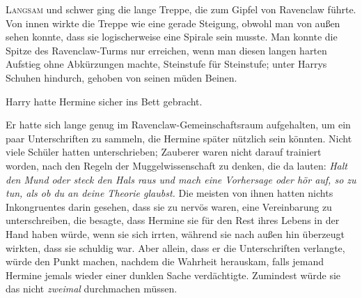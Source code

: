 
\lettrine{L}{angsam} und schwer ging die lange Treppe, die zum Gipfel von Ravenclaw führte. Von innen wirkte die Treppe wie eine gerade Steigung, obwohl man von außen sehen konnte, dass sie logischerweise eine Spirale sein musste. Man konnte die Spitze des Ravenclaw-Turms nur erreichen, wenn man diesen langen harten Aufstieg ohne Abkürzungen machte, Steinstufe für Steinstufe; unter Harrys Schuhen hindurch, gehoben von seinen müden Beinen.

Harry hatte Hermine sicher ins Bett gebracht.

Er hatte sich lange genug im Ravenclaw-Gemeinschaftsraum aufgehalten, um ein paar Unterschriften zu sammeln, die Hermine später nützlich sein könnten. Nicht viele Schüler hatten unterschrieben; Zauberer waren nicht darauf trainiert worden, nach den Regeln der Muggelwissenschaft zu denken, die da lauten: \emph{Halt den Mund oder steck den Hals raus und mach eine Vorhersage oder hör auf, so zu tun, als ob du an deine Theorie glaubst.} Die meisten von ihnen hatten nichts Inkongruentes darin gesehen, dass sie zu nervös waren, eine Vereinbarung zu unterschreiben, die besagte, dass Hermine sie für den Rest ihres Lebens in der Hand haben würde, wenn sie sich irrten, während sie nach außen hin überzeugt wirkten, dass sie schuldig war. Aber allein, dass er die Unterschriften verlangte, würde den Punkt machen, nachdem die Wahrheit herauskam, falls jemand Hermine jemals wieder einer dunklen Sache verdächtigte. Zumindest würde sie das nicht \emph{zweimal} durchmachen müssen.


